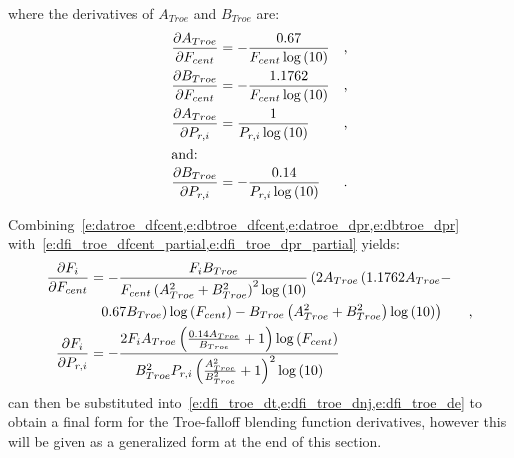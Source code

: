 \documentclass[12pt]{article}
\begin{document}
where the derivatives of $A_{Troe}$ and $B_{Troe}$ are:
\begin{align}
 \frac{\partial A_{Troe} }{\partial F_{cent} } &= - \frac{0.67}{F_{cent} \log{\left (10 \right )}} & \text{,} \label{e:datroe_dfcent} \\
\frac{\partial B_{Troe} }{\partial F_{cent} } &= - \frac{1.1762}{F_{cent} \log{\left (10 \right )}} & \text{,} \label{e:dbtroe_dfcent} \\
\frac{\partial A_{Troe} }{\partial P_{r, i} } &= \frac{1}{P_{r, i} \log{\left (10 \right )}} & \text{,} \label{e:datroe_dpr} \\
\intertext{and:}
\frac{\partial B_{Troe} }{\partial P_{r, i} } &= - \frac{0.14}{P_{r, i} \log{\left (10 \right )}} & \text{.} \label{e:dbtroe_dpr} \\
\end{align}

Combining~\cref{e:datroe_dfcent,e:dbtroe_dfcent,e:datroe_dpr,e:dbtroe_dpr} with~\cref{e:dfi_troe_dfcent_partial,e:dfi_troe_dpr_partial} yields:
\begin{align}
\frac{\partial F_{i} }{\partial F_{cent} } &= - \frac{F_{i} B_{Troe}}{F_{cent} \left(A_{Troe}^{2} + B_{Troe}^{2}\right)^{2} \log{\left (10 \right )}} \left(2 A_{Troe} \left( 1.1762 A_{Troe} - \right. \right . & \nonumber \\
& \mathindent[s] \left. \left. 0.67 B_{Troe}\right) \log{\left (F_{cent} \right )} - B_{Troe} \left(A_{Troe}^{2} + B_{Troe}^{2}\right) \log{\left (10 \right )}\right) & \text{,} \label{e:dfi_troe_dfcent} \\
\frac{\partial F_{i} }{\partial P_{r, i} } &= - \frac{2 F_{i} A_{Troe} \left(\frac{0.14 A_{Troe}}{B_{Troe}} + 1\right) \log{\left (F_{cent} \right )}}{B_{Troe}^{2} P_{r, i} \left(\frac{A_{Troe}^{2}}{B_{Troe}^{2}} + 1\right)^{2} \log{\left (10 \right )}} \label{e:dfi_troe_dpr} &
\end{align}
 can then be substituted into~\cref{e:dfi_troe_dt,e:dfi_troe_dnj,e:dfi_troe_de} to obtain a final form for the Troe-falloff blending function derivatives, however this will be given as a generalized form at the end of this section.
\end{document}
